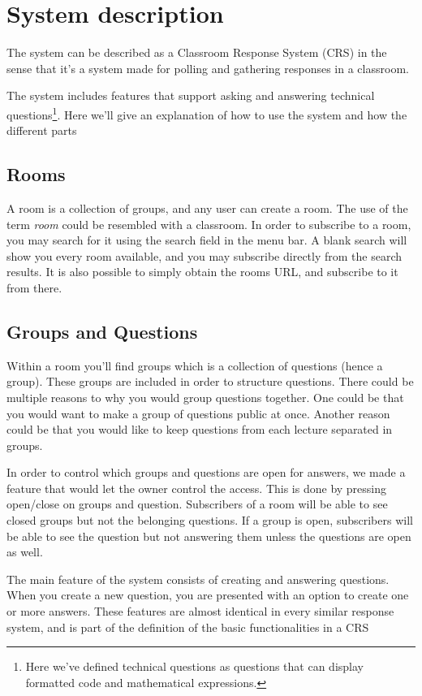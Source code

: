 \section{System description}
The system can be described as a Classroom Response System (CRS) in the sense that it's a system made for polling and gathering responses in a classroom.

The system includes features that support asking and answering technical questions\footnote{Here we've defined technical questions as questions that can display formatted code and mathematical expressions.}. Here we'll give an explanation of how to use the system and how the different parts 


\subsection{Rooms}
A room is a collection of groups, and any user can create a room. The use of the term \emph{room} could be resembled with a classroom. In order to subscribe to a room, you may search for it using the search field in the menu bar. A blank search will show you every room available, and you may subscribe directly from the search results. It is also possible to simply obtain the rooms URL, and subscribe to it from there.


\subsection{Groups and Questions}
Within a room you'll find groups which is a collection of questions (hence a group). These groups are included in order to structure questions. There could be multiple reasons to why you would group questions together. One could be that you would want to make a group of questions public at once. Another reason could be that you would like to keep questions from each lecture separated in groups.

In order to control which groups and questions are open for answers, we made a feature that would let the owner control the access. This is done by pressing open/close on groups and question. Subscribers of a room will be able to see closed groups but not the belonging questions. If a group is open, subscribers will be able to see the question but not answering them unless the questions are open as well.

The main feature of the system consists of creating and answering questions. When you create a new question, you are presented with an option to create one or more answers.
These features are almost identical in every similar response system, and is part of the definition of the basic functionalities in a CRS 

